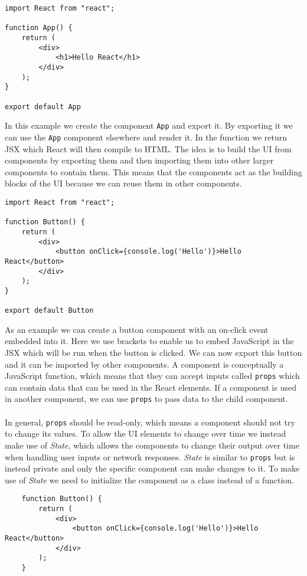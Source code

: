 \begin{lstlisting}
import React from "react";

function App() {
    return (
        <div>
            <h1>Hello React</h1>
        </div>
    );
}

export default App
\end{lstlisting}
In this example we create the component \texttt{App} and export it.
By exporting it we can use the \texttt{App} component elsewhere and render it.
In the function we return JSX which React will then compile to HTML.
The idea is to build the UI from components by exporting them and then importing them into other larger components to contain them.
This means that the components act as the building blocks of the UI because we can reuse them in other components.
\begin{lstlisting}
import React from "react";

function Button() {
    return (
        <div>
            <button onClick={console.log('Hello')}>Hello React</button>
        </div>
    );
}

export default Button
\end{lstlisting}
As an example we can create a button component with an on-click event embedded into it.
Here we use brackets to enable us to embed JavaScript in the JSX which will be run when the button is clicked.
We can now export this button and it can be imported by other components.
A component is conceptually a JavaScript function, which means that they can accept inputs called \texttt{props} which can contain data that can be used in the React elements.
If a component is used in another component, we can use \texttt{props} to pass data to the child component.
\\\\
In general, \texttt{props} should be read-only, which means a component should not try to change its values.
To allow the UI elements to change over time we instead make use of \textit{State}, which allows the components to change their output over time when handling user inputs or network responses.
\textit{State} is similar to \texttt{props} but is instead private and only the specific component can make changes to it.
To make use of \textit{State} we need to initialize the component as a class instead of a function.
\begin{lstlisting}
    function Button() {
        return (
            <div>
                <button onClick={console.log('Hello')}>Hello React</button>
            </div>
        );
    }
\end{lstlisting}
